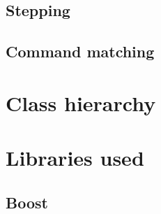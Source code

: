 \subsection*{Stepping}

\subsection*{Command matching}

\section{Class hierarchy}


\section{Libraries used}

\subsection*{Boost\cite{boost}}

